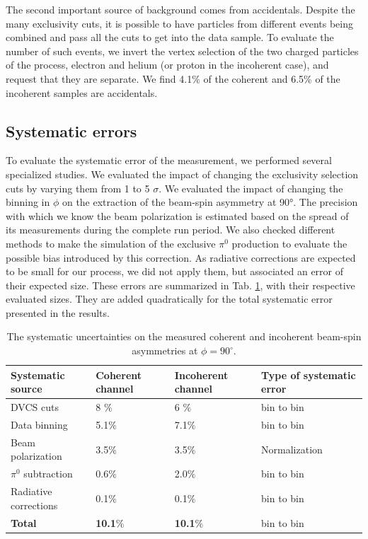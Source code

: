 \documentclass[aps,prc,preprint,superscriptaddress]{revtex4}
\begin{document}
The second important source of background comes from accidentals. Despite the many exclusivity cuts, it is 
possible to have particles from different events being combined and pass all the cuts to get 
into the data sample. To evaluate the number of such events, we invert the vertex selection 
of the two charged 
particles of the process, electron and helium (or proton in the incoherent case), and request that they
are separate. We find 4.1\% of the coherent and 6.5\% of the incoherent samples are accidentals. 

\subsection{Systematic errors}

To evaluate the systematic error of the measurement, we performed several specialized studies. We 
evaluated the impact of changing the exclusivity selection cuts by varying them from 1 to 5 $\sigma$. 
We evaluated the impact of changing the binning in $\phi$ on the extraction of the beam-spin asymmetry
at 90°. The precision with which we know the beam polarization is estimated based on the spread 
of its measurements during the complete run period. We also checked different methods to make the 
simulation of the exclusive $\pi^0$ production to evaluate the 
possible bias introduced by this correction. As radiative corrections are expected to be small
for our process, we did not apply them, but associated an error of their expected size.
These errors are summarized in Tab. \ref{Table:systematic_uncertainties}, with their respective 
evaluated sizes. They are added quadratically for the total systematic error presented in the results.

\begin{table}[tbp]
\begin{center}
	\begin{tabular}{|m{4cm}|m{2cm}<{\centering}|m{2.3cm}<{\centering}|m{3.7cm}<{\centering}|}
\hline
\bf Systematic source & \bf  Coherent channel  & \bf Incoherent channel & \bf Type of systematic 
error\\
\hline
DVCS cuts & 8 $\%$ &  6 $\%$ & bin to bin\\
\hline
Data binning & 5.1$\%$ & 7.1$\%$ &bin to bin\\
\hline
Beam polarization &  3.5$\%$ &  3.5$\%$& Normalization\\
\hline
$\pi^0$ subtraction &  0.6$\%$ &  2.0$\%$ &bin to bin\\
\hline
Radiative corrections &  0.1$\%$ & 0.1$\%$ & bin to bin\\
\hline
\textbf{Total} &  \textbf{10.1}$\%$ &   \textbf{10.1}$\%$ &bin to 
bin\\
\hline
\end{tabular}
\caption{The systematic uncertainties on the measured coherent and incoherent 
beam-spin asymmetries at $\phi = 90^{\circ}$.}
\label{Table:systematic_uncertainties}
\end{center}
\end{table}
\end{document}
